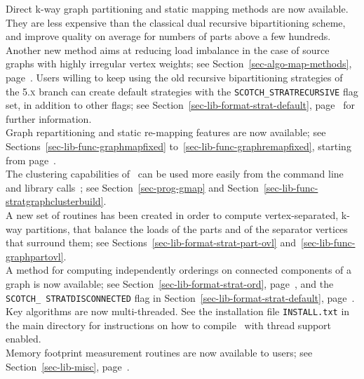 Direct k-way graph partitioning and static mapping methods are now
available. They are less expensive than the classical dual recursive
bipartitioning scheme, and improve quality on average for numbers of
parts above a few hundreds. Another new method aims at reducing load
imbalance in the case of source graphs with highly irregular vertex
weights; see Section~\ref{sec-algo-map-methods},
page~\pageref{sec-algo-map-methods}. Users willing to keep using the
old recursive bipartitioning strategies of the \textsc{5.x} branch can
create default strategies with the \texttt{SCOTCH\_\lbt STRATRECURSIVE}
flag set, in addition to other flags; see
Section~\ref{sec-lib-format-strat-default},
page~\pageref{sec-lib-format-strat-default} for further information.
\\

Graph repartitioning and static re-mapping features are now available;
see Sections~\ref{sec-lib-func-graphmapfixed}
to~\ref{sec-lib-func-graphremapfixed}, starting from
page~\pageref{sec-lib-func-graphmapfixed}.
\\

The clustering capabilities of \scotch\ can be used more easily from
the command line and library calls~; see Section~\ref{sec-prog-gmap}
and Section~\ref{sec-lib-func-stratgraphclusterbuild}.
\\

A new set of routines has been created in order to compute
vertex-separated, k-way partitions, that balance the loads of the
parts and of the separator vertices that surround them; see
Sections~\ref{sec-lib-format-strat-part-ovl}
and~\ref{sec-lib-func-graphpartovl}.
\\

A method for computing independently orderings on connected components
of a graph is now available; see Section~\ref{sec-lib-format-strat-ord},
page~\pageref{sec-lib-format-strat-ord}, and the \texttt{SCOTCH\_\lbt
STRAT\lbt DISCON\lbt NECTED} flag in
Section~\ref{sec-lib-format-strat-default},
page~\pageref{sec-lib-format-strat-default}.
\\

Key algorithms are now multi-threaded. See the installation file
\texttt{INSTALL.txt} in the main directory for instructions on how to
compile \scotch\ with thread support enabled.
\\

Memory footprint measurement routines are now available to users;
see Section~\ref{sec-lib-misc}, page~\pageref{sec-lib-misc}.
\\

